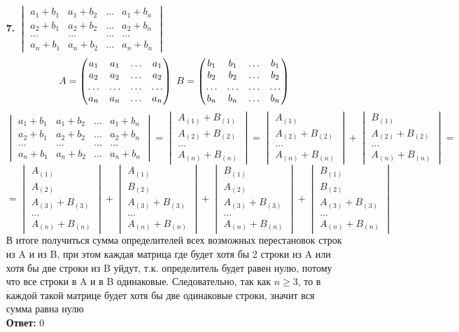 \documentclass[a4paper]{article}
\newcommand{\mat}[1]{\begin{pmatrix} #1 \end{pmatrix}}
\renewcommand{\det}[1]{\begin{vmatrix} #1 \end{vmatrix}}
\newcommand{\ts}{\text{\space}}
\renewcommand{\geq}{\geqslant}
\begin{document}
\begin{enumerate}
    \item[\textbf{7.}]$\det{a_1 + b_1 & a_1 + b_2 & \ldots & a_1 + b_n\\
	a_2 + b_1 & a_2 + b_2 & \ldots & a_2 + b_n\\
	\ldots & \ldots & \ldots & \ldots\\
	a_n + b_1 & a_n + b_2 & \ldots & a_n + b_n}$
    $$A = \mat{a_1 & a_1 & \ldots & a_1\\
	a_2 & a_2  & \ldots & a_2\\
	\ldots & \ldots & \ldots & \ldots\\
	a_n  & a_n& \ldots & a_n}\ts
    B = \mat{b_1 & b_1 & \ldots & b_1\\
	b_2 & b_2  & \ldots & b_2\\
	\ldots & \ldots & \ldots & \ldots\\
	b_n  & b_n& \ldots & b_n}$$ 
    $$\det{a_1 + b_1 & a_1 + b_2 & \ldots & a_1 + b_n\\
	a_2 + b_1 & a_2 + b_2 & \ldots & a_2 + b_n\\
	\ldots & \ldots & \ldots & \ldots\\
	a_n + b_1 & a_n + b_2 & \ldots & a_n + b_n} = \det{A_{(1)} + B_{(1)} \\ A_{(2)} + B_{(2)}\\ \dots \\ A_{(n)} + B_{(n)}} = \det{A_{(1)} \\ A_{(2)} + B_{(2)}\\ \dots \\ A_{(n)} + B_{(n)}} + \det{B_{(1)} \\ A_{(2)} + B_{(2)}\\ \dots \\ A_{(n)} + B_{(n)}} = $$
    $$= \det{A_{(1)} \\ A_{(2)}\\  A_{(3)} + B_{(3)} \\ \dots \\ A_{(n)} + B_{(n)}} + \det{A_{(1)} \\ B_{(2)}\\ A_{(3)} + B_{(3)} \\ \dots \\ A_{(n)} + B_{(n)}} + \det{B_{(1)} \\ A_{(2)}\\ A_{(3)} + B_{(3)}\\ \dots \\ A_{(n)} + B_{(n)}} + \det{B_{(1)} \\ B_{(2)}\\ A_{(3)} + B_{(3)}\\ \dots \\ A_{(n)} + B_{(n)}}$$
    В итоге получиться сумма определителей всех возможных перестановок строк из A и из B, при этом каждая матрица где будет хотя бы 2 строки из A или хотя бы две строки из B уйдут, т.к. определитель будет равен нулю, потому что все строки в A и в B одинаковые. Следовательно, так как $n\geq 3$, то в каждой такой матрице будет хотя бы две одинаковые строки, значит вся сумма равна нулю\\
    \textbf{Ответ:} $0$
\end{enumerate}
\end{document}
